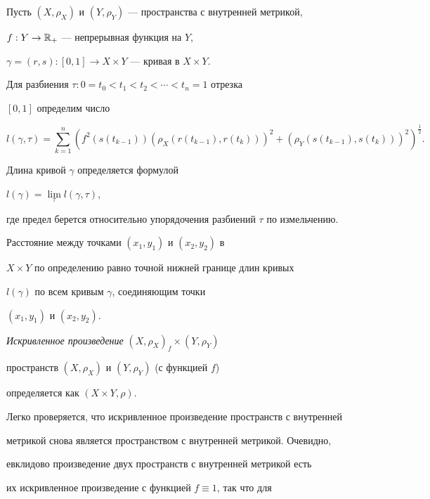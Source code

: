 \begin{defns}


\label{f} 


Пусть $(X,\rho_{X})$ и $(Y,\rho_{Y})$ --- пространства с внутренней метрикой,


$f:Y \rightarrow \Bbb{R}_{+}$ --- непрерывная функция на $Y$,


$\gamma = (r,s): [0,1] \rightarrow X \times Y$ --- кривая в $X \times Y$.


Для разбиения $\tau: 0= t_{0}< t_{1}< t_{2}< \dotsb <t_{n}=1$ отрезка


$[0,1]$ определим число


$$


l(\gamma, \tau)= \sum_{k=1}^{n}


(f^{2}(s(t_{k-1}))(\rho_{X}(r(t_{k-1}),r(t_{k})))^{2}+


(\rho_{Y}(s(t_{k-1}),s(t_{k})))^{2})^{\frac{1}{2}}.


$$


Длина кривой $\gamma$ определяется формулой


$l(\gamma)= \lim\limits_{\tau}l(\gamma, \tau)$,


где предел берется относительно упорядочения разбиений $\tau$ по измельчению.


Расстояние между точками $(x_{1},y_{1})$ и $(x_{2},y_{2})$ в


$X \times Y$ по определению равно точной нижней границе длин кривых


$l(\gamma)$ по всем кривым $\gamma$, соединяющим точки


$(x_{1},y_{1})$ и $(x_{2},y_{2})$.


{\it Искривленное произведение} $(X,\rho_{X})_{f} \times (Y,\rho_{Y})$


пространств $(X,\rho_{X})$ и $(Y,\rho_{Y})$ (с функцией $f$)


определяется как $(X \times Y, \rho)$.


\end{defns}





Легко проверяется, что искривленное произведение пространств с внутренней


метрикой снова является пространством с внутренней метрикой. Очевидно,


евклидово произведение двух пространств с внутренней метрикой есть


их искривленное произведение с функцией $f \equiv 1$, так что для


